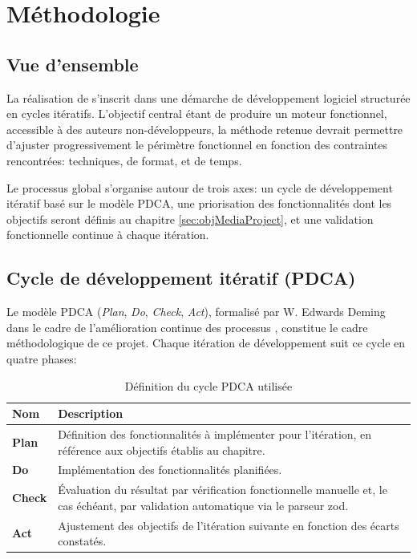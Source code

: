\section{Méthodologie}

\subsection{Vue d'ensemble}

La réalisation de \ns s'inscrit dans une démarche de développement logiciel structurée en cycles itératifs. L'objectif central étant de produire un moteur fonctionnel, accessible à des auteurs non-développeurs, la méthode retenue devrait permettre d'ajuster progressivement le périmètre fonctionnel en fonction des contraintes rencontrées: techniques, de format, et de temps.

Le processus global s'organise autour de trois axes: un cycle de développement itératif basé sur le modèle PDCA, une priorisation des fonctionnalités dont les objectifs seront définis au chapitre \ref{sec:objMediaProject}, et une validation fonctionnelle continue à chaque itération.


\subsection{Cycle de développement itératif (PDCA)} \label{sec:PDCA}

Le modèle PDCA (\textit{Plan}, \textit{Do}, \textit{Check}, \textit{Act}), formalisé par W. Edwards Deming dans le cadre de l'amélioration continue des processus \parencite{deming_out_1986}, constitue le cadre méthodologique de ce projet. Chaque itération de développement suit ce cycle en quatre phases:

\begin{table}[H]
    \centering
    \caption{Définition du cycle PDCA utilisée}
    \renewcommand{\arraystretch}{1.5}
    \begin{tabular}{p{1.5cm} p{11cm}}
        \hline
        \textbf{Nom} & \textbf{Description} \\
        \hline
        \textbf{Plan} & Définition des fonctionnalités à implémenter pour l'itération, en référence aux objectifs établis au chapitre. \\
        \addlinespace
        \textbf{Do} & Implémentation des fonctionnalités planifiées. \\
        \addlinespace
        \textbf{Check} & Évaluation du résultat par vérification fonctionnelle manuelle et, le cas échéant, par validation automatique via le \gls{parseur} \gls{zod}. \\
        \addlinespace
        \textbf{Act} & Ajustement des objectifs de l'itération suivante en fonction des écarts constatés. \\
        \hline
    \end{tabular}
    \label{tab:defPDCA}
\end{table}

